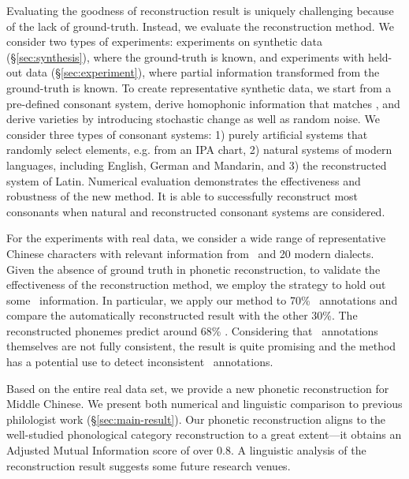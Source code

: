 Evaluating the {goodness} of reconstruction result is uniquely challenging because of the lack of ground-truth.
Instead, we evaluate the reconstruction method.
We consider two types of experiments: experiments on synthetic data (\S\ref{sec:synthesis}), where the ground-truth is known, and experiments with held-out data (\S\ref{sec:experiment}), where partial information transformed from the ground-truth is known.
To create representative synthetic data, we start from a pre-defined consonant system, derive homophonic information that matches \fq, and derive varieties by introducing stochastic change as well as random noise. 
We consider three types of consonant systems: 1) purely artificial systems that randomly select elements, e.g. from an IPA chart, 
2) natural systems of modern languages, including English, German and Mandarin, and 3) the reconstructed system of Latin.
Numerical evaluation demonstrates the effectiveness and robustness of the new method.
It is able to successfully reconstruct most consonants when natural and reconstructed consonant systems are considered. 
 
For the experiments with real data, we consider a wide range of representative Chinese characters with relevant information from \gy~and 20 modern dialects.
Given the absence of ground truth in phonetic reconstruction, 
to validate the effectiveness of the reconstruction method, we employ the strategy to hold out some \fq~information.
In particular, we apply our method to 70\% \fq~annotations and compare the automatically reconstructed result with the other 30\%.
The reconstructed phonemes predict around 68\% \fq.
Considering that \fq~annotations themselves are not fully consistent,
the result is quite promising and the method has a potential use to detect inconsistent \fq~annotations.

Based on the entire real data set, we provide a new phonetic reconstruction for Middle Chinese.
We present both numerical and linguistic comparison to previous philologist work (\S\ref{sec:main-result}).
Our phonetic reconstruction aligns to the well-studied phonological category reconstruction to a great extent---it obtains an Adjusted Mutual Information \citep{AMI-2010} score of over 0.8. 
A linguistic analysis of the reconstruction result suggests some future research venues. 
